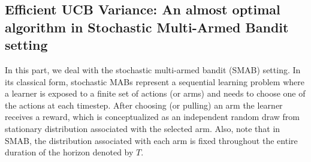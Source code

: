 \documentclass[MS,synopsis]{iitmdiss}
\begin{document}
\subsection{Efficient UCB Variance: An almost optimal algorithm in Stochastic Multi-Armed Bandit setting}


In this part, we deal with the stochastic multi-armed bandit (SMAB) setting. In its classical form, stochastic MABs represent a sequential learning problem where a learner is exposed to a finite set of actions (or arms) and needs to choose one of the actions at each timestep. After choosing (or pulling) an arm the learner receives a reward, which is conceptualized as an independent random draw from stationary distribution associated with the selected arm. Also, note that in SMAB, the distribution associated with each arm is fixed throughout the entire duration of the horizon denoted by $T$. 

%
\end{document}
